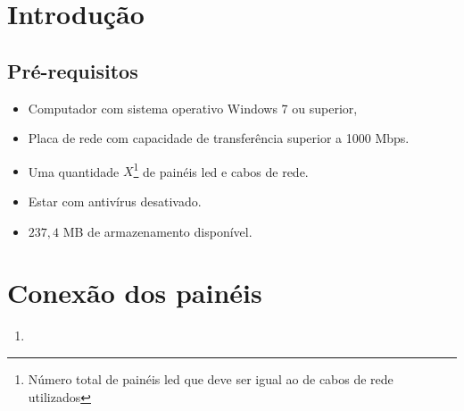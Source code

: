 \documentclass[12pt, a4paper]{article}
\begin{document}
\section{Introdução}\label{Introdução}
\subsection{Pré-requisitos}\label{Pré-requisitos}
\begin{itemize}
	\item Computador com sistema operativo Windows 7 ou superior,	
	\item Placa de rede com capacidade de transferência superior a 1000 Mbps.
	\item Uma quantidade $X$\footnote{Número total de painéis led que deve ser igual ao de cabos de rede utilizados} de painéis led e cabos de rede.
	\item Estar com antivírus desativado.
	\item $237,4$ MB de armazenamento disponível.
\end{itemize}

\cleardoublepage
\section{Conexão dos painéis}\label{Conexão dos painéis}
\begin{enumerate}
	\item 
\end{enumerate}

\newpage
\end{document}
